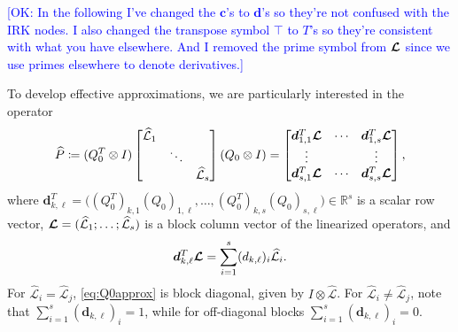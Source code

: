 \documentclass[review]{siamart}
\newcommand{\OK}[1]{\textcolor{blue}{[OK: #1]}}
\begin{document}

%
\OK{In the following I've changed the $\bm{c}$'s to $\bm{d}$'s so they're not confused with the IRK nodes. I also changed the transpose symbol $\top$ to $T$'s so they're consistent with  what you have elsewhere. And I removed the prime symbol from $\bm{{\cal L}}$ since we use primes elsewhere to denote derivatives.}
%

To develop effective approximations, we are particularly interested in the operator
%
\begin{align}\label{eq:Q0approx}
\widehat{P} \coloneqq (Q_0^T\otimes I) \begin{bmatrix}
	\widehat{\mathcal{L}}_1  & \\ & \ddots \\ && \widehat{\mathcal{L}}_s\end{bmatrix}
	(Q_0\otimes I)
= \begin{bmatrix}
	\bm{d}^T_{1,1} \bm{{\cal L}} & \cdots & \bm{d}^T_{1,s} \bm{{\cal L}} \\
	\vdots & & \vdots \\
	\bm{d}^T_{s,1} \bm{{\cal L}} & \cdots & \bm{d}^T_{s,s} \bm{{\cal L}}
	\end{bmatrix},
\end{align}
%
where $\bm{d}^T_{k,\ell} = \Big((Q_0^T)_{k ,1} (Q_0)_{1, \ell},
\ldots, (Q_0^T)_{k, s} (Q_0)_{s, \ell} \Big) \in \mathbb{R}^s$ is a scalar row
vector, $\bm{{\cal L}} = (\widehat{\mathcal{L}}_1; \ldots; \widehat{\mathcal{L}}_s)$
is a block column vector of the linearized operators, and
%
\begin{align*}
\bm{d}^T_{k,\ell} \bm{{\cal L}} = \sum \limits_{i = 1}^s (d_{k, \ell})_i
	\widehat{\mathcal{L}}_i.
\end{align*}
%
For $\widehat{\mathcal{L}}_i = \widehat{\mathcal{L}}_j$, \eqref{eq:Q0approx}
is block diagonal, given by $I\otimes\widehat{\mathcal{L}}$. For
$\widehat{\mathcal{L}}_i \neq \widehat{\mathcal{L}}_j$, note that
$\sum_{i=1}^s (\bm{d}_{k, \ell})_i = 1$, while for off-diagonal blocks
$\sum_{i=1}^s (\bm{d}_{k, \ell})_i = 0$.
\end{document}
